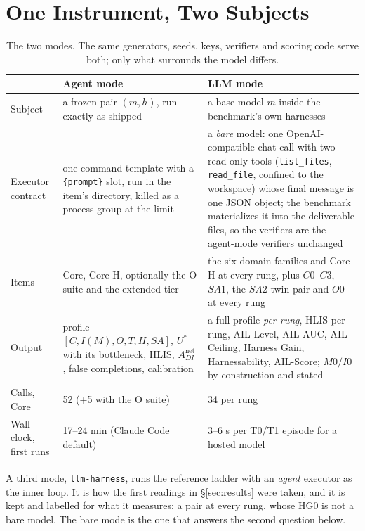 \documentclass[11pt]{article}
\theoremstyle{definition}
\begin{document}
\section{One Instrument, Two Subjects}\label{sec:two}

\begin{table}[!htbp]
\centering\small
\begin{tabularx}{\textwidth}{@{}lYY@{}}
\toprule
 & Agent mode & LLM mode \\
\midrule
Subject & a frozen pair $(m,h)$, run exactly as shipped & a base model $m$ inside the benchmark's own harnesses \\
Executor contract & one command template with a \texttt{\{prompt\}} slot, run in the item's directory, killed as a process group at the limit & a \emph{bare} model: one OpenAI-compatible chat call with two read-only tools (\texttt{list\_files}, \texttt{read\_file}, confined to the workspace) whose final message is one JSON object; the benchmark materializes it into the deliverable files, so the verifiers are the agent-mode verifiers unchanged \\
Items & Core, Core-H, optionally the O suite and the extended tier & the six domain families and Core-H at every rung, plus $C0$--$C3$, $SA1$, the $SA2$ twin pair and $O0$ at every rung \\
Output & profile $[C, I(M), O, T, H, SA]$, $U^{*}$ with its bottleneck, HLIS, $A^{\text{net}}_{DI}$, false completions, calibration & a full profile \emph{per rung}, HLIS per rung, AIL-Level, AIL-AUC, AIL-Ceiling, Harness Gain, Harnessability, AIL-Score; $M0/I0$ by construction and stated \\
Calls, Core & 52 (+5 with the O suite) & 34 per rung \\
Wall clock, first runs & 17--24 min (Claude Code default) & 3--6 s per T0/T1 episode for a hosted model \\
\bottomrule
\end{tabularx}
\caption{The two modes. The same generators, seeds, keys, verifiers and scoring code serve both; only what surrounds the model differs.}
\label{tab:modes}
\end{table}

A third mode, \texttt{llm-harness}, runs the reference ladder with an \emph{agent} executor as the inner loop. It is how the first readings in \S\ref{sec:results} were taken, and it is kept and labelled for what it measures: a pair at every rung, whose HG0 is not a bare model. The bare mode is the one that answers the second question below.
\end{document}
